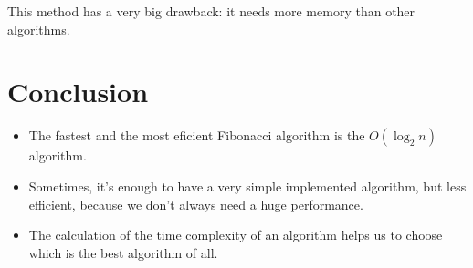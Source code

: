\documentclass{article}
\begin{document}
		\begin{center}
			\par This method has a very big drawback: it needs more memory than other algorithms.
		\end{center}

	\newpage
	\section{Conclusion}
		\begin{itemize}
			\item The fastest and the most eficient Fibonacci algorithm is the $O(\log_2 n)$ algorithm.
			\item Sometimes, it's enough to have a very simple implemented algorithm, but less efficient, because we don't always need a huge performance.
			\item The calculation of the time complexity of an algorithm helps us to choose which is the best algorithm of all.
		\end{itemize}

\end{document}
